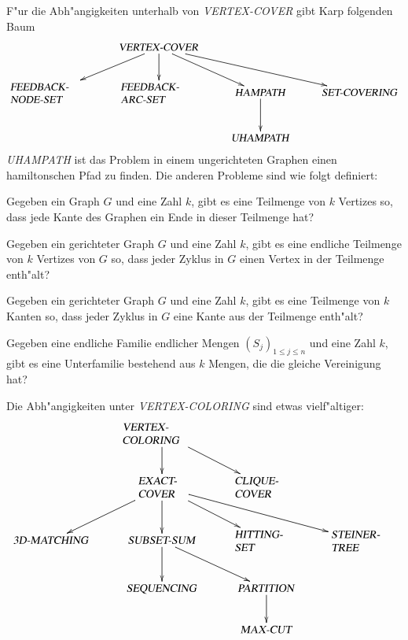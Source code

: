 F"ur die Abh"angigkeiten unterhalb von \textsl{VERTEX-COVER} gibt 
Karp folgenden Baum
\[
\xymatrix{
	&\text{\textsl{VERTEX-COVER}} \ar[dl] \ar[d]\ar[dr]\ar[drr]
\\
\begin{minipage}{1.0truein}
\textsl{FEEDBACK-NODE-SET}
\end{minipage}
	&\begin{minipage}{1.0truein}\textsl{FEEDBACK-ARC-SET}\end{minipage}
		&\text{\textsl{HAMPATH}}\ar[d]
			&\text{\textsl{SET-COVERING}}
\\
	&
		&\text{\textsl{UHAMPATH}}
}
\]
\textsl{UHAMPATH} ist das Problem in einem ungerichteten Graphen
einen hamiltonschen Pfad zu finden. Die anderen Probleme sind wie
folgt definiert:
\begin{description}
\item[\textsl{VERTEX-COVER}:] Gegeben ein Graph $G$ und eine Zahl
$k$, gibt es eine Teilmenge von $k$ Vertizes so, dass jede
Kante des Graphen ein Ende in dieser Teilmenge hat?
\item[\textsl{FEEDBACK-NODE-SET}:] Gegeben ein gerichteter Graph $G$
und eine Zahl $k$, gibt es eine endliche Teilmenge von $k$ Vertizes
von $G$ so, dass jeder Zyklus in $G$ einen Vertex in der Teilmenge 
enth"alt?
\item[\textsl{FEEDBACK-ARC-SET}:] Gegeben ein gerichteter Graph $G$
und eine Zahl $k$, gibt es eine Teilmenge von $k$ Kanten so, dass
jeder Zyklus in $G$ eine Kante aus der Teilmenge enth"alt?
\item[\textsl{SET-COVERING}:] Gegeben eine endliche Familie endlicher
Mengen $(S_j)_{1\le j\le n}$ und eine Zahl $k$, gibt es eine Unterfamilie
bestehend aus $k$ Mengen, die die gleiche Vereinigung hat?
\end{description}
Die Abh"angigkeiten unter \textsl{VERTEX-COLORING} sind etwas vielf"altiger:
\[
\xymatrix{
	&\begin{minipage}{1truein}
	\textsl{VERTEX-COLORING}
	\end{minipage} \ar[d]\ar[dr]
\\
	&\begin{minipage}{0.6truein}
	\textsl{EXACT-COVER}
	\end{minipage} \ar[dl] \ar[d] \ar[dr] \ar[drr]
		&\begin{minipage}{0.8truein}
		\textsl{CLIQUE-COVER}
		\end{minipage} 
\\
\text{\textsl{3D-MATCHING}}
	&\text{\textsl{SUBSET-SUM}} \ar[dr] \ar[d]
		&\begin{minipage}{0.8truein}
		\textsl{HITTING-SET}
		\end{minipage}
			&\begin{minipage}{0.8truein}
			\textsl{STEINER-TREE}
			\end{minipage}
\\
	&\text{\textsl{SEQUENCING}}
		&\text{\textsl{PARTITION}} \ar[d]
\\
	&
		&\text{\textsl{MAX-CUT}}
}
\]
